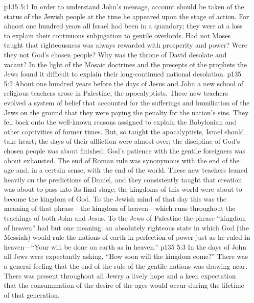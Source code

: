 \vs p135 5:1 In order to understand John’s message, account should be taken of the status of the Jewish people at the time he appeared upon the stage of action. For almost one hundred years all Israel had been in a quandary; they were at a loss to explain their continuous subjugation to gentile overlords. Had not Moses taught that righteousness was always rewarded with prosperity and power? Were they not God’s chosen people? Why was the throne of David desolate and vacant? In the light of the Mosaic doctrines and the precepts of the prophets the Jews found it difficult to explain their long\hyp{}continued national desolation.
\vs p135 5:2 About one hundred years before the days of Jesus and John a new school of religious teachers arose in Palestine, the apocalyptists. These new teachers evolved a system of belief that accounted for the sufferings and humiliation of the Jews on the ground that they were paying the penalty for the nation’s sins. They fell back onto the well\hyp{}known reasons assigned to explain the Babylonian and other captivities of former times. But, so taught the apocalyptists, Israel should take heart; the days of their affliction were almost over; the discipline of God’s chosen people was about finished; God’s patience with the gentile foreigners was about exhausted. The end of Roman rule was synonymous with the end of the age and, in a certain sense, with the end of the world. These new teachers leaned heavily on the predictions of Daniel, and they consistently taught that creation was about to pass into its final stage; the kingdoms of this world were about to become the kingdom of God. To the Jewish mind of that day this was the meaning of that phrase---the kingdom of heaven---which runs throughout the teachings of both John and Jesus. To the Jews of Palestine the phrase “kingdom of heaven” had but one meaning: an absolutely righteous state in which God (the Messiah) would rule the nations of earth in perfection of power just as he ruled in heaven---“Your will be done on earth as in heaven.”
\vs p135 5:3 In the days of John all Jews were expectantly asking, “How soon will the kingdom come?” There was a general feeling that the end of the rule of the gentile nations was drawing near. There was present throughout all Jewry a lively hope and a keen expectation that the consummation of the desire of the ages would occur during the lifetime of that generation.
